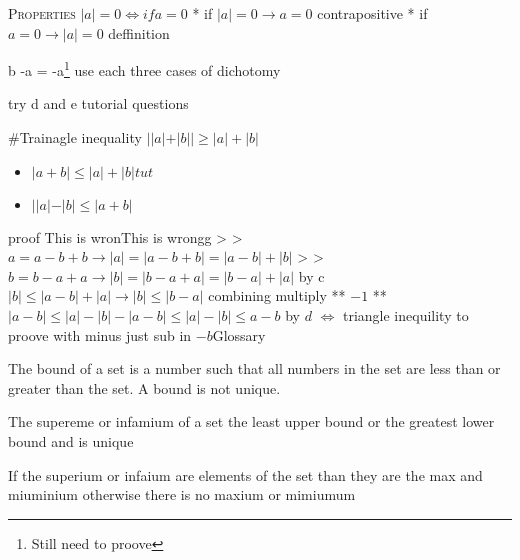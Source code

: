 \documentclass{tufte-handout}
\providecommand{\tightlist}{%
  \setlength{\itemsep}{0pt}\setlength{\parskip}{0pt}}
\begin{document}
\textsc{Properties} \(|a| = 0 \Leftrightarrow if a = 0\) * if
\(|a| = 0 \to a = 0\) contrapositive * if \(a = 0 \to |a| = 0\)
deffinition

b \textbar{}-a \textbar{} = \textbar{}-a\textbar{}\footnote{Still need
  to proove} use each three cases of dichotomy

try d and e tutorial questions

\#Trainagle inequality \(||a|+|b|| \geq |a| + |b|\)

\begin{itemize}
\tightlist
\item
  \(|a + b| \leq |a| + |b| tut\)
\item
  \(| |a| - |b| \leq |a + b|\)
\end{itemize}

proof This is wronThis is wrongg \textgreater{} \textgreater{}
\(a = a - b + b \to |a| = |a - b + b| = |a-b| + |b|\) \textgreater{}
\textgreater{} \(b = b - a + a \to |b| = |b - a + a| = |b-a| + |a|\) by
c \(|b| \leq |a - b| + |a| \to |b| \leq |b - a|\) combining multiply **
\(-1\) ** \(|a - b| \leq |a| - |b| - |a - b| \leq |a| - |b| \leq a-b\)
\textbar{} by \(d\) \(\Leftrightarrow\) triangle inequility to proove
with minus just sub in \(-b\)Glossary

\begin{description}
\tightlist
\item[Bound]
The bound of a set is a number such that all numbers in the set are less
than or greater than the set. A bound is not unique.
\item[Supremum]
The supereme or infamium of a set the least upper bound or the greatest
lower bound and is unique
\item[Maximum and miniumium]
If the superium or infaium are elements of the set than they are the max
and miuminium otherwise there is no maxium or mimiumum
\end{description}
\end{document}
